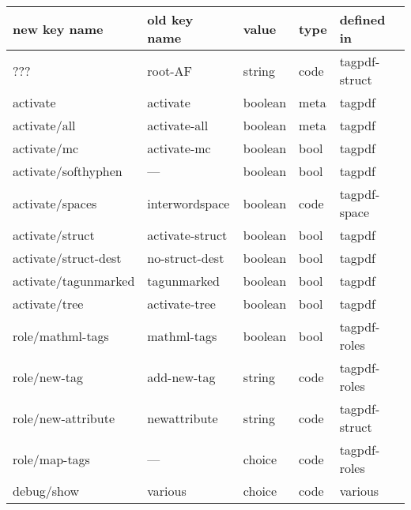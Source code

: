 \begin{tabular}{lllll}
\toprule
new key name    & old key name & value            &type   & defined in \\\midrule
 ???            & root-AF      & string           &code   &tagpdf-struct\\[4pt]\midrule

activate        & activate        & boolean         &meta  & tagpdf \\
activate/all    & activate-all    & boolean         &meta & tagpdf\\
activate/mc     & activate-mc     & boolean         &bool  & tagpdf\\
activate/softhyphen & ---         & boolean         &bool  & tagpdf \\    
activate/spaces & interwordspace  & boolean         &code  & tagpdf-space\\
activate/struct & activate-struct & boolean         &bool  & tagpdf\\  
activate/struct-dest & no-struct-dest&boolean       &bool  & tagpdf\\
activate/tagunmarked& tagunmarked & boolean         &bool & tagpdf\\
activate/tree   & activate-tree   & boolean         &bool  & tagpdf\\[4pt]\midrule  
role/mathml-tags & mathml-tags    & boolean          &bool  & tagpdf-roles\\
role/new-tag     & add-new-tag    & string           &code  & tagpdf-roles\\
role/new-attribute&newattribute   & string           &code  & tagpdf-struct\\
role/map-tags      & ---            & choice           & code & tagpdf-roles\\[4pt]\midrule
debug/show       &various          &choice            &code  & various \\ 

\end{tabular}
